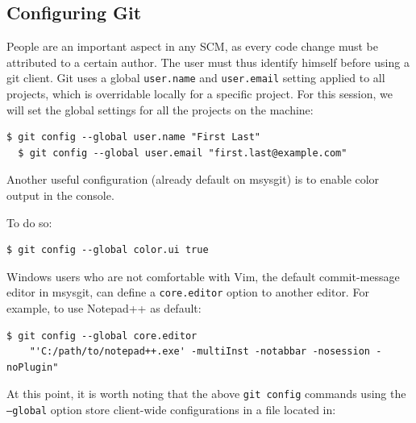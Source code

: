 \documentclass{../common/tufte-latex/tufte-handout}
\begin{document}
\subsection{Configuring Git}

People are an important aspect in any SCM, as every code change must be attributed to a certain author.
The user must thus identify himself before using a git client.
Git uses a global \texttt{user.name} and \texttt{user.email} setting applied to all projects, which is overridable locally for a specific project.
For this session, we will set the global settings for all the projects on the machine:

\begin{lstlisting}[style=BashInputStyle]
  $ git config --global user.name "First Last"
  $ git config --global user.email "first.last@example.com"
\end{lstlisting}

Another useful configuration (already default on msysgit) is to enable color output in the console.

\noindent To do so:

\begin{lstlisting}[style=BashInputStyle]
  $ git config --global color.ui true
\end{lstlisting}

Windows users who are not comfortable with Vim, the default commit-message editor in msysgit, can define a \texttt{core.editor} option to another editor.
For example, to use Notepad++ as default:

\begin{lstlisting}[style=BashInputStyle]
  $ git config --global core.editor
    "'C:/path/to/notepad++.exe' -multiInst -notabbar -nosession -noPlugin"
\end{lstlisting}

At this point, it is worth noting that the above \texttt{git config} commands using the \texttt{--global} option store client-wide configurations in a file located in:
\end{document}
